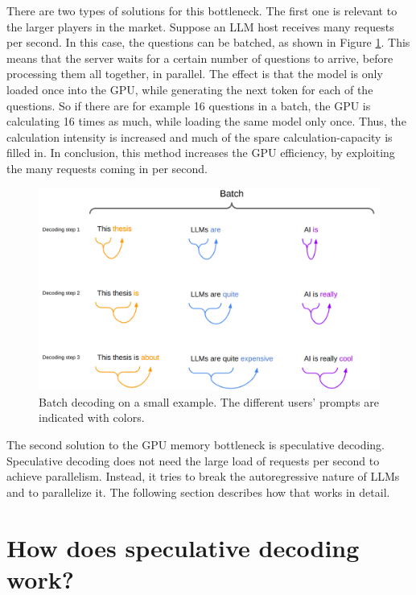 There are two types of solutions for this bottleneck. The first one is relevant to the larger players in the market. Suppose an LLM host receives many requests per second. In this case, the questions can be batched, as shown in Figure \ref{fig:spec_dec_batch}. This means that the server waits for a certain number of questions to arrive, before processing them all together, in parallel. The effect is that the model is only loaded once into the GPU, while generating the next token for each of the questions. So if there are for example 16 questions in a batch, the GPU is calculating 16 times as much, while loading the same model only once. Thus, the calculation intensity is increased and much of the spare calculation-capacity is filled in. In conclusion, this method increases the GPU efficiency, by exploiting the many requests coming in per second.

\begin{figure}[h]
	\centering
	\includegraphics[width=1\linewidth]{fig/spec_dec_batch.png}
	\caption{Batch decoding on a small example. The different users' prompts are indicated with colors.}
	\label{fig:spec_dec_batch}
\end{figure}

The second solution to the GPU memory bottleneck is speculative decoding. Speculative decoding does not need the large load of requests per second to achieve parallelism. Instead, it tries to break the autoregressive nature of LLMs and to parallelize it. The following section describes how that works in detail.

\section{How does speculative decoding work?}

